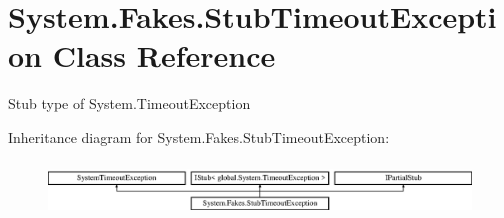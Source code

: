 \hypertarget{class_system_1_1_fakes_1_1_stub_timeout_exception}{\section{System.\-Fakes.\-Stub\-Timeout\-Exception Class Reference}
\label{class_system_1_1_fakes_1_1_stub_timeout_exception}
}


Stub type of System.\-Timeout\-Exception 


Inheritance diagram for System.\-Fakes.\-Stub\-Timeout\-Exception\-:\begin{figure}[H]
\begin{center}
\leavevmode
\includegraphics[height=1.481482cm]{class_system_1_1_fakes_1_1_stub_timeout_exception}
\end{center}
\end{figure}
